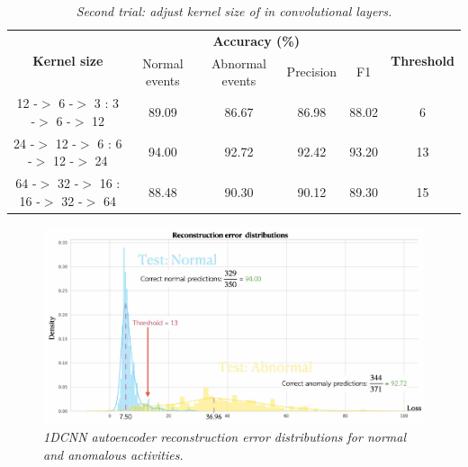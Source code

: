 \begin{table}[H]
  \begin{center}
    \caption[Second trial: adjust kernel size of in convolutional layers.]{\emph{Second trial: adjust kernel size of in convolutional layers.} \\ \hspace{\textwidth}}\label{tab:cnn2t}
    \begin{tabular}{c c c c c c c}
      \hline
      \multicolumn{2}{c}{\multirow{2}{*}{\textbf{Kernel size}}}   & \multicolumn{4}{c}{\textbf{Accuracy (\%)}} & \multirow{2}{*}{\textbf{Threshold}}                                      \\
      \cline{3-6}
                                                                  &                                            & Normal events                       & Abnormal events & Precision & F1 & \\
      \hline
      \multicolumn{2}{c}{12 -$>$  6 -$>$  3 :  3 -$>$  6 -$>$ 12} & 89.09                                      & 86.67                               & 86.98           & 88.02     & 6    \\
      \multicolumn{2}{c}{24 -$>$ 12 -$>$  6 :  6 -$>$ 12 -$>$ 24} & 94.00                                      & 92.72                               & 92.42           & 93.20     & 13   \\
      \multicolumn{2}{c}{64 -$>$ 32 -$>$ 16 : 16 -$>$ 32 -$>$ 64} & 88.48                                      & 90.30                               & 90.12           & 89.30     & 15   \\
      \hline
    \end{tabular}
  \end{center}
\end{table}

\begin{figure}[H]
  \centering
  \caption[1DCNN autoencoder reconstruction error distributions for normal and anomalous activities.]{\emph{1DCNN autoencoder reconstruction error distributions for normal and anomalous activities.}} \label{fig:autoencoder_cnn_outcome}
  \includegraphics[scale = 0.18]{figures/autoencoder_cnn_outcome.jpg}
\end{figure}


